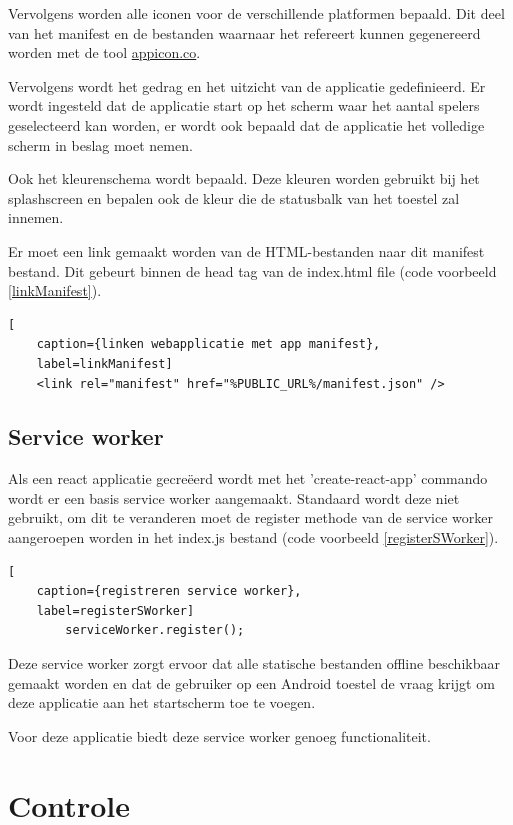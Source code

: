 		Vervolgens worden alle iconen voor de verschillende platformen bepaald. Dit deel van het manifest en de bestanden waarnaar het refereert kunnen gegenereerd worden met de tool \href{https://appicon.co}{appicon.co}.
		
		Vervolgens wordt het gedrag en het uitzicht van de applicatie gedefinieerd. Er wordt ingesteld dat de applicatie start op het scherm waar het aantal spelers geselecteerd kan worden, er wordt ook bepaald dat de applicatie het volledige scherm in beslag moet nemen.
		
		Ook het kleurenschema wordt bepaald. Deze kleuren worden gebruikt bij het splashscreen en bepalen ook de kleur die de statusbalk van het toestel zal innemen. 
		
		Er moet een link gemaakt worden van de HTML-bestanden naar dit manifest bestand. Dit gebeurt binnen de head tag van de index.html file (code voorbeeld \ref{linkManifest}). 
		
\begin{lstlisting}[
	caption={linken webapplicatie met app manifest},
	label=linkManifest]
	<link rel="manifest" href="%PUBLIC_URL%/manifest.json" />
\end{lstlisting}
		
		
	\subsection{Service worker}
		
		Als een react applicatie gecreëerd wordt met het 'create-react-app' commando wordt er  een basis service worker aangemaakt. Standaard wordt deze niet gebruikt, om dit te veranderen moet de register methode van de service worker aangeroepen worden in het index.js bestand (code voorbeeld \ref{registerSWorker}).
		
\begin{lstlisting}[
	caption={registreren service worker},
	label=registerSWorker]
		serviceWorker.register();
\end{lstlisting}
		
		Deze service worker zorgt ervoor dat alle statische bestanden offline beschikbaar gemaakt worden en dat de gebruiker op een Android toestel de vraag krijgt om deze applicatie aan het startscherm toe te voegen.
		
		Voor deze applicatie biedt deze service worker genoeg functionaliteit.
		
\newpage
\section{Controle}

